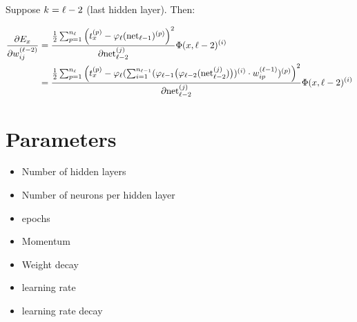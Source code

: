 
Suppose $k = {\ell} - 2$ (last hidden layer). Then:

\begin{align}
    \frac{\partial E_x}{\partial w_{ij}^{({\ell}-2)}} &= \frac{\frac{1}{2} \sum_{p=1}^{n_{\ell}} \left ( t_x^{(p)} -\varphi_{{\ell}}(\mathrm{net}_{{\ell}-1})^{(p)} \right )^2}{\partial \mathrm{net}_{{\ell}-2}^{(j)}} \Phi(x, {\ell}-2)^{(i)}\\
    &= \frac{\frac{1}{2} \sum_{p=1}^{n_{\ell}} \left ( t_x^{(p)} -\varphi_{{\ell}}(\sum_{i=1}^{n_{{\ell}-1}} (
        \varphi_{{\ell}-1} \big (\varphi_{{\ell}-2}(\mathrm{net}_{{\ell}-2}^{(j)}) \big)
    )^{(i)} \cdot w_{ip}^{({\ell}-1)})^{(p)} \right )^2}{\partial \mathrm{net}_{{\ell}-2}^{(j)}} \Phi(x, {\ell}-2)^{(i)}\\
\end{align}

\section{Parameters}
\begin{itemize}
    \item Number of hidden layers
    \item Number of neurons per hidden layer
    \item \Glspl{epoch}
    \item Momentum
    \item Weight decay
    \item \Gls{learning rate}
    \item \Gls{learning rate decay}
\end{itemize}
